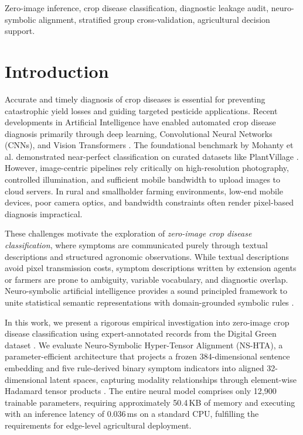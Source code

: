 \documentclass[conference]{IEEEtran}
\begin{document}
\begin{IEEEkeywords}
Zero-image inference, crop disease classification, diagnostic leakage audit, neuro-symbolic alignment, stratified group cross-validation, agricultural decision support.
\end{IEEEkeywords}

\section{Introduction}
Accurate and timely diagnosis of crop diseases is essential for preventing catastrophic yield losses and guiding targeted pesticide applications. Recent developments in Artificial Intelligence have enabled automated crop disease diagnosis primarily through deep learning, Convolutional Neural Networks (CNNs), and Vision Transformers \cite{pacal2024, das2024, hemalatha2024}. The foundational benchmark by Mohanty et al. \cite{mohanty2016} demonstrated near-perfect classification on curated datasets like PlantVillage \cite{hughes2015}. However, image-centric pipelines rely critically on high-resolution photography, controlled illumination, and sufficient mobile bandwidth to upload images to cloud servers. In rural and smallholder farming environments, low-end mobile devices, poor camera optics, and bandwidth constraints often render pixel-based diagnosis impractical.

These challenges motivate the exploration of \textit{zero-image crop disease classification}, where symptoms are communicated purely through textual descriptions and structured agronomic observations. While textual descriptions avoid pixel transmission costs, symptom descriptions written by extension agents or farmers are prone to ambiguity, variable vocabulary, and diagnostic overlap. Neuro-symbolic artificial intelligence provides a sound principled framework to unite statistical semantic representations with domain-grounded symbolic rules \cite{marra2024, yu2023}. 

In this work, we present a rigorous empirical investigation into zero-image crop disease classification using expert-annotated records from the Digital Green dataset \cite{digitalgreen2026}. We evaluate Neuro-Symbolic Hyper-Tensor Alignment (NS-HTA), a parameter-efficient architecture that projects a frozen 384-dimensional sentence embedding \cite{reimers2019, wang2020} and five rule-derived binary symptom indicators into aligned 32-dimensional latent spaces, capturing modality relationships through element-wise Hadamard tensor products \cite{kim2017, zadeh2017}. The entire neural model comprises only 12,900 trainable parameters, requiring approximately 50.4\,KB of memory and executing with an inference latency of 0.036\,ms on a standard CPU, fulfilling the requirements for edge-level agricultural deployment.
\end{document}
